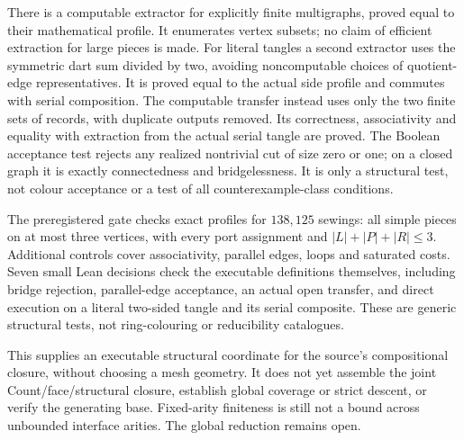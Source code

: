 There is a computable extractor for explicitly finite multigraphs,
proved equal to their mathematical profile. It enumerates vertex
subsets; no claim of efficient extraction for large pieces is made.
For literal tangles a second extractor uses the symmetric dart sum
divided by two, avoiding noncomputable choices of quotient-edge
representatives. It is proved equal to the actual side profile and
commutes with serial composition.
The computable transfer instead uses only the two finite sets of
records, with duplicate outputs removed. Its correctness, associativity
and equality with extraction from the actual serial tangle are proved.
The Boolean acceptance test rejects any realized nontrivial cut of
size zero or one; on a closed graph it is exactly connectedness and
bridgelessness. It is only a structural test, not colour acceptance
or a test of all counterexample-class conditions.

The preregistered gate checks exact profiles for $138{,}125$ sewings:
all simple pieces on at most three vertices, with every port assignment
and $|L|+|P|+|R|\le3$. Additional controls cover associativity,
parallel edges, loops and saturated costs. Seven small Lean decisions
check the executable definitions themselves, including bridge rejection,
parallel-edge acceptance, an actual open transfer, and direct execution
on a literal two-sided tangle and its serial composite. These are generic
structural tests, not ring-colouring or reducibility catalogues.

This supplies an executable structural coordinate for the source's
compositional closure, without choosing a mesh geometry. It does not
yet assemble the joint Count/face/structural closure, establish global
coverage or strict descent, or verify the generating base. Fixed-arity
finiteness is still not a bound across unbounded interface arities.
The global reduction remains open.

